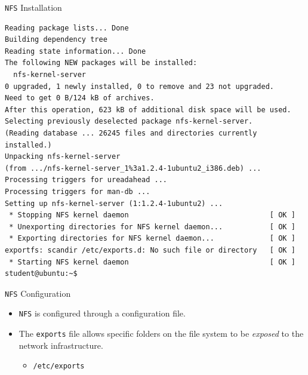 \documentclass[xcolor=table,aspectratio=169]{beamer}
\begin{document}
\begin{frame}[fragile]{\texttt{NFS} Installation}
  \begin{tcolorbox}
    \lstset{
      basicstyle=\tiny\ttfamily,
    }
    \begin{lstlisting}
Reading package lists... Done
Building dependency tree
Reading state information... Done
The following NEW packages will be installed:
  nfs-kernel-server
0 upgraded, 1 newly installed, 0 to remove and 23 not upgraded.
Need to get 0 B/124 kB of archives.
After this operation, 623 kB of additional disk space will be used.
Selecting previously deselected package nfs-kernel-server.
(Reading database ... 26245 files and directories currently installed.)
Unpacking nfs-kernel-server 
(from .../nfs-kernel-server_1%3a1.2.4-1ubuntu2_i386.deb) ...
Processing triggers for ureadahead ...
Processing triggers for man-db ...
Setting up nfs-kernel-server (1:1.2.4-1ubuntu2) ...
 * Stopping NFS kernel daemon                                 [ OK ]
 * Unexporting directories for NFS kernel daemon...           [ OK ]
 * Exporting directories for NFS kernel daemon...             [ OK ]              
exportfs: scandir /etc/exports.d: No such file or directory   [ OK ]
 * Starting NFS kernel daemon                                 [ OK ]
student@ubuntu:~$

    \end{lstlisting}
  \end{tcolorbox}
\end{frame}

\begin{frame}{\texttt{NFS} Configuration}
  \begin{itemize}
    \item \texttt{NFS} is configured through a configuration file.
    \item The \texttt{exports} file allows specific folders on the file system to be \textit{exposed} to the network infrastructure.
      \begin{itemize}
        \item \texttt{/etc/exports}
      \end{itemize}
  \end{itemize}
\end{frame}
\end{document}
